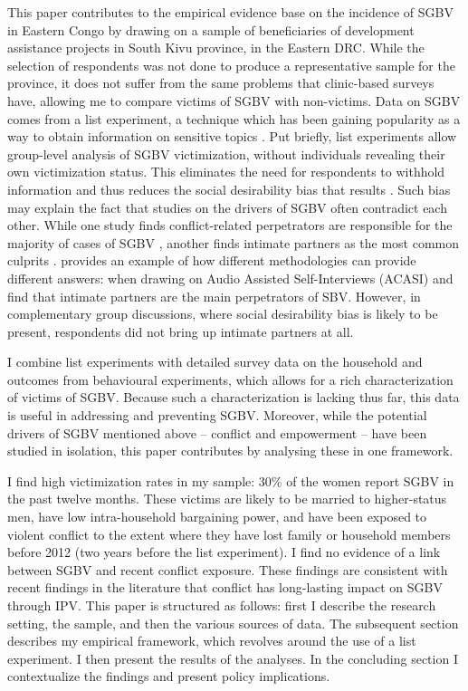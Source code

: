 This paper contributes to the empirical evidence base on the incidence of SGBV in Eastern Congo by drawing on a sample of beneficiaries of development assistance projects in South Kivu province, in the Eastern DRC. While the selection of respondents was not done to produce a representative sample for the province, it does not suffer from the same problems that clinic-based surveys have, allowing me to compare victims of SGBV with non-victims. Data on SGBV comes from a list experiment, a technique which has been gaining popularity as a way to obtain information on sensitive topics \citep[see e.g.][]{Sniderman1991,Holbrook2010,Bulte2019,Peterman2018,LaBrie2000,Corstange2009}. Put briefly, list experiments allow group-level analysis of SGBV victimization, without individuals revealing their own victimization status. This eliminates the need for respondents to withhold information and thus reduces the social desirability bias that results \cite{Blair2012}. Such bias may explain the fact that studies on the drivers of SGBV often contradict each other. While one study finds conflict-related perpetrators are responsible for the majority of cases of SGBV \citep{Johnson2010}, another finds intimate partners as the most common culprits \citep{Peterman2011}.\citet{Stark2017} provides an example of how different methodologies can provide different answers: when drawing on Audio Assisted Self-Interviews (ACASI) and find that intimate partners are the main perpetrators of SBV. However, in complementary group discussions, where social desirability bias is likely to be present, respondents did not bring up intimate partners at all. 

I combine list experiments with detailed survey data on the household and outcomes from behavioural experiments, which allows for a rich characterization of victims of SGBV.  Because such a characterization is lacking thus far, this data is useful in addressing and preventing SGBV. Moreover, while the potential drivers of SGBV mentioned above -- conflict and empowerment -- have been studied in isolation, this paper contributes by analysing these in one framework.

I find high victimization rates in my sample: 30\% of the women report SGBV in the past twelve months. These victims are likely to be married to higher-status men, have low intra-household bargaining power, and have been exposed to violent conflict to the extent where they have lost family or household members before 2012 (two years before the list experiment). I find no evidence of a link between SGBV and recent conflict exposure. These findings are consistent with recent findings in the literature that conflict has long-lasting impact on SGBV through IPV. This paper is structured as follows: first I describe the research setting, the sample, and then the various sources of data. The subsequent section describes my empirical framework, which revolves around the use of a list experiment. I then present the results of the analyses. In the concluding section I contextualize the findings and present policy implications.

